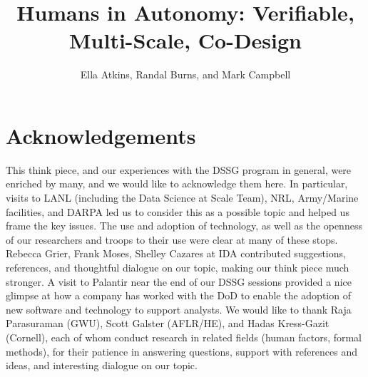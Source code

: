 \documentclass[11pt]{dssg}
\begin{document}
\title{Humans in Autonomy: Verifiable, Multi-Scale, Co-Design}

\author{Ella Atkins, Randal Burns, and Mark Campbell}

\maketitle














%








\section*{Acknowledgements}

This think piece, and our experiences with the DSSG program in general, were enriched by many, and we would like to acknowledge them here. In particular, visits to LANL (including the Data Science at Scale Team), NRL, Army/Marine facilities, and DARPA led us to consider this as a possible topic and helped us frame the key issues. The use and adoption of technology, as well as the openness of our researchers and troops to their use were clear at many of these stops. Rebecca Grier, Frank Moses, Shelley Cazares at IDA contributed suggestions, references, and thoughtful dialogue on our topic, making our think piece much stronger. A visit to Palantir near the end of our DSSG sessions provided a nice glimpse at how a company has worked with the DoD to enable the adoption of new software and technology to support analysts. We would like to thank Raja Parasuraman (GWU), Scott Galster (AFLR/HE), and Hadas Kress-Gazit (Cornell), each of whom conduct research in related fields (human factors, formal methods), for their patience in answering questions, support with references and ideas, and interesting dialogue on our topic. 
\end{document}
